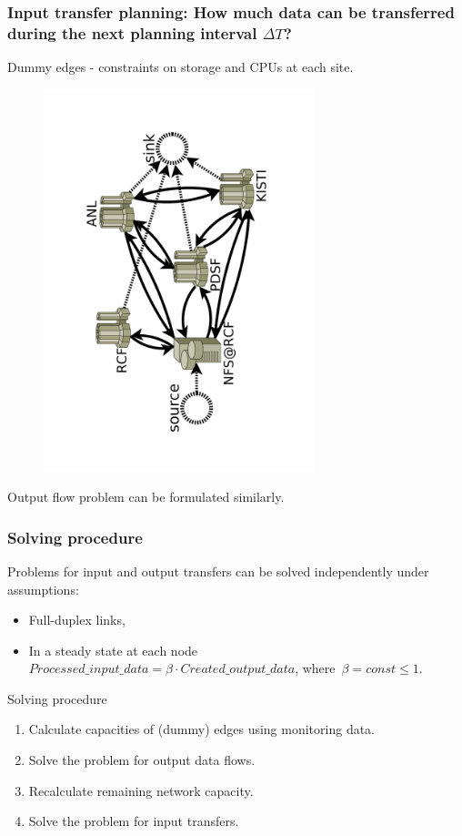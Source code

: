 \documentclass{beamer}
\begin{document}
\begin{frame}\frametitle{Input transfer planning: How much data can be transferred during the next planning interval $\Delta T$?}
Dummy edges - constraints on  storage and CPUs at each site.
\begin{figure}[h]
	\begin{center}
		\includegraphics [trim= 30mm 30mm 30mm 30mm , clip, angle =-90, width=0.7\textwidth]{pic/real_network.pdf}
	\end{center}
	\label{real_network}
\end{figure} 
\vspace{-3mm}
Output flow problem can be formulated similarly.
\end{frame}

\begin{frame}\frametitle{Solving procedure}
\begin{block}{}
Problems for input and output transfers can be solved independently under assumptions: 
\begin{itemize}
\item Full-duplex links,
\item In a steady state at each node $Processed\_input\_data= \beta \cdot Created\_output\_data$, where~$\beta = const\leq 1$.
\end{itemize}
\end{block} 

\begin{block}{Solving procedure}
\begin{enumerate}
\item Calculate capacities of (dummy) edges using monitoring data.
\item Solve the problem for output data flows.
\item Recalculate remaining network capacity.
\item Solve the problem for input transfers.
\end{enumerate}
\end{block}    
\end{frame}
\end{document}
